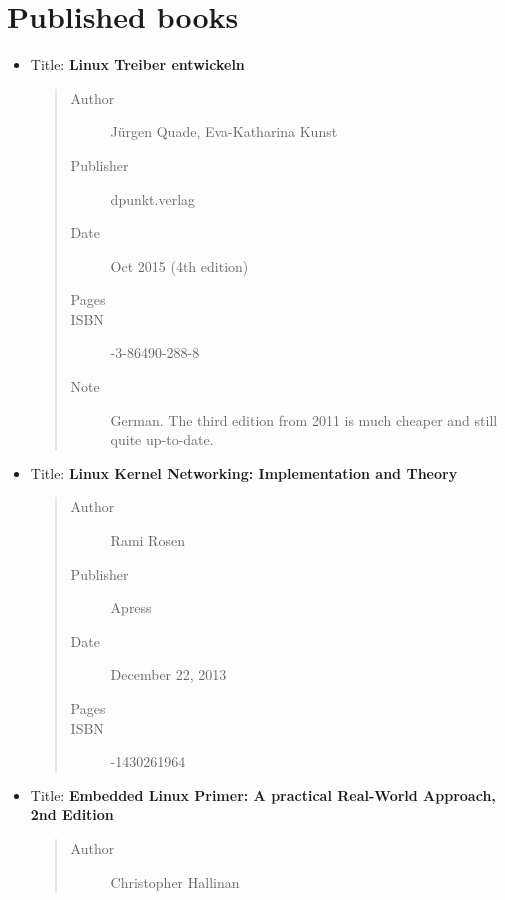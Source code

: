 \documentclass[a4paper,8pt,english]{sphinxmanual}
\begin{document}
\section{Published books}
\label{process/kernel-docs:published-books}\begin{itemize}
\item {} 
Title: \textbf{Linux Treiber entwickeln}
\begin{quote}\begin{description}
\item[{Author}] \leavevmode
Jürgen Quade, Eva-Katharina Kunst

\item[{Publisher}] \leavevmode
dpunkt.verlag

\item[{Date}] \leavevmode
Oct 2015 (4th edition)

\item[{Pages}] 

\item[{ISBN}] -3-86490-288-8

\item[{Note}] \leavevmode
German. The third edition from 2011 is
much cheaper and still quite up-to-date.

\end{description}\end{quote}

\item {} 
Title: \textbf{Linux Kernel Networking: Implementation and Theory}
\begin{quote}\begin{description}
\item[{Author}] \leavevmode
Rami Rosen

\item[{Publisher}] \leavevmode
Apress

\item[{Date}] \leavevmode
December 22, 2013

\item[{Pages}] 

\item[{ISBN}] -1430261964

\end{description}\end{quote}

\item {} 
Title: \textbf{Embedded Linux Primer: A practical Real-World Approach, 2nd Edition}
\begin{quote}\begin{description}
\item[{Author}] \leavevmode
Christopher Hallinan


\end{description}
\end{quote}
\end{itemize}
\end{document}
